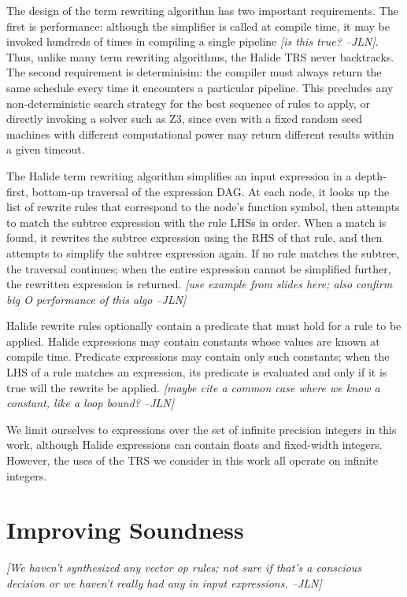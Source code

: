 \documentclass[sigplan,review,anonymous]{acmart}\settopmatter{printfolios=true,printccs=false,printacmref=false}
\newcommand{\jln}[1]{\textcolor{uwpurple}{\textit{[{#1} --JLN]}}}
\begin{document}
The design of the term rewriting algorithm has two important requirements. The first is performance: although the simplifier is called at compile time, it may be invoked hundreds of times in compiling a single pipeline \jln{is this true?}. Thus, unlike many term rewriting algorithms, the Halide TRS never backtracks. The second requirement is determinisim: the compiler must always return the same schedule every time it encounters a particular pipeline. This precludes any non-deterministic search strategy for the best sequence of rules to apply, or directly invoking a solver such as Z3, since even with a fixed random seed machines with different computational power may return different results within a given timeout.

The Halide term rewriting algorithm simplifies an input expression in a depth-first, bottom-up traversal of the expression DAG. At each node, it looks up the list of rewrite rules that correspond to the node's function symbol, then attempts to match the subtree expression with the rule LHSs in order. When a match is found, it rewrites the subtree expression using the RHS of that rule, and then attempts to simplify the subtree expression again. If no rule matches the subtree, the traversal continues; when the entire expression cannot be simplified further, the rewritten expression is returned. \jln{use example from slides here; also confirm big O performance of this algo}

Halide rewrite rules optionally contain a predicate that must hold for a rule to be applied. Halide expressions may contain constants whose values are known at compile time. Predicate expressions may contain only such constants; when the LHS of a rule matches an expression, its predicate is evaluated and only if it is true will the rewrite be applied. \jln{maybe cite a common case where we know a constant, like a loop bound?}

We limit ourselves to expressions over the set of infinite precision integers in
this work, although Halide expressions can contain floats and fixed-width
integers. However, the uses of the TRS we consider in this work all operate
on infinite integers.

\section{Improving Soundness}
\jln{We haven't synthesized any vector op rules; not sure if that's a conscious decision or we haven't really had any in input expressions.}
\end{document}
